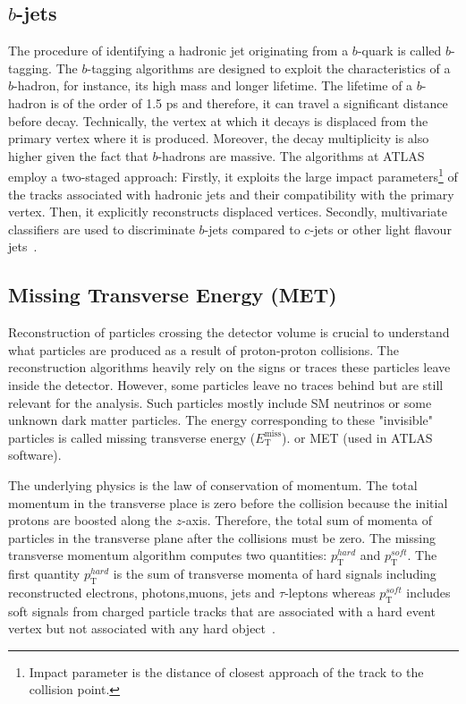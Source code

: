 \subsection*{$b$-jets}
The procedure of identifying a hadronic jet originating from a $b$-quark is called $b$-tagging.
The $b$-tagging algorithms are designed to exploit the characteristics of a $b$-hadron, for instance,
its high mass and longer lifetime. The lifetime of a $b$-hadron is of the order of 1.5 ps and 
therefore, it can travel a significant distance before decay. Technically, the vertex at which 
it decays is displaced from the primary vertex where it is produced. Moreover, the decay 
multiplicity is also higher given the fact that $b$-hadrons are massive. The algorithms at ATLAS
employ a two-staged approach: Firstly, it exploits the large impact 
parameters\footnote{Impact parameter is the distance of closest approach
of the track to the collision point.} of the tracks associated with hadronic jets
and their compatibility with the primary vertex. Then, it explicitly reconstructs displaced vertices.
Secondly, multivariate classifiers are used to discriminate $b$-jets compared to $c$-jets or other
light flavour jets~\cite{FTAG-2018-01}. 


\subsection{Missing Transverse Energy (MET)}
Reconstruction of particles crossing the detector volume is crucial to understand what particles
are produced as a result of proton-proton collisions. The reconstruction algorithms heavily rely on the
signs or traces these particles leave inside the detector. However, some particles leave no traces
behind but are still relevant for the analysis. Such particles mostly include SM neutrinos or some unknown dark matter
particles. The energy corresponding to these "invisible" particles is called missing transverse energy ($E_{\text{T}}^{\text{miss}}$).
or MET (used in ATLAS software).

The underlying physics is the law of conservation of momentum. The total momentum in the transverse place is zero before the collision because 
the initial protons are boosted along the $z$-axis. Therefore, the total sum of momenta of particles in the transverse plane after the collisions must be zero. 
The missing transverse momentum algorithm computes two quantities: $p_{\text{T}}^{hard}$ and $p_{\text{T}}^{soft}$. The first quantity $p_{\text{T}}^{hard}$ 
is the sum of transverse momenta of hard signals including reconstructed electrons, photons,muons, jets and $\tau$-leptons whereas $p_{\text{T}}^{soft}$ includes
soft signals from charged particle tracks that are associated with a hard event vertex but not associated with any hard object~\cite{CERN-EP-2024-023}. 

